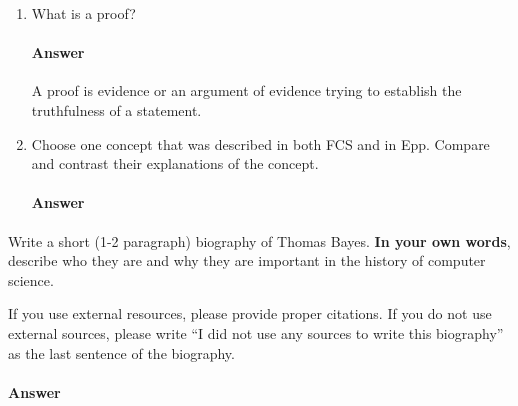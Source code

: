 \documentclass{article}
\begin{document}
\begin{enumerate}

    \item What is a proof?

        \paragraph{Answer}

        A proof is evidence or an argument of evidence trying to establish the truthfulness of a statement.


    \item Choose one concept that was described in both FCS and in Epp.
        Compare and contrast their explanations of the concept.

        \paragraph{Answer}


\end{enumerate}


Write a short (1-2 paragraph) biography of Thomas Bayes.
\textbf{In your own words}, describe who they are and why they are important in
the history of computer science.

If you use external resources, please provide
proper citations. If you do not use external sources, please write ``I did not
use any sources to write this biography'' as the last sentence of the
biography.

\paragraph{Answer}
\end{document}
